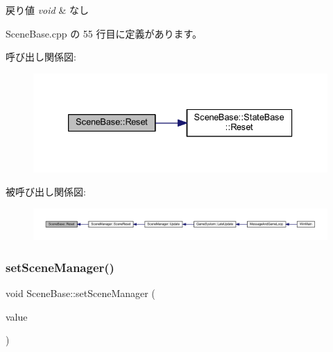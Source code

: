 \begin{DoxyRetVals}{戻り値}
{\em void} & なし \\
\hline
\end{DoxyRetVals}


 Scene\+Base.\+cpp の 55 行目に定義があります。

呼び出し関係図\+:
\nopagebreak
\begin{figure}[H]
\begin{center}
\leavevmode
\includegraphics[width=333pt]{class_scene_base_ae2dc09554ec21ffe231fa73a6cdd7ca1_cgraph}
\end{center}
\end{figure}
被呼び出し関係図\+:
\nopagebreak
\begin{figure}[H]
\begin{center}
\leavevmode
\includegraphics[width=350pt]{class_scene_base_ae2dc09554ec21ffe231fa73a6cdd7ca1_icgraph}
\end{center}
\end{figure}
\mbox{\label{class_scene_base_aae1930cae97c27ee7d54b4bd8896a515}} 
\subsubsection{\texorpdfstring{set\+Scene\+Manager()}{setSceneManager()}}
{\footnotesize\ttfamily void Scene\+Base\+::set\+Scene\+Manager (\begin{DoxyParamCaption}\item[{\mbox{\hyperlink{class_scene_manager}{Scene\+Manager}} $\ast$}]{value }\end{DoxyParamCaption})\hspace{0.3cm}{\ttfamily [inline]}}



